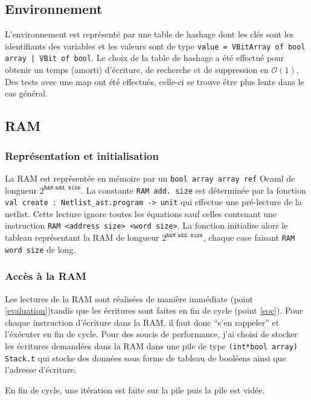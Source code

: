 \documentclass{article}
\newcommand{\code}[1]{\colorbox{White}{\texttt{#1}}}
\begin{document}
\subsection{Environnement}
\label{sec:environnement}

L'environnement est représenté par une table de hashage dont les clés
sont les identifiants des variables et les valeurs sont de type
\texttt{value = VBitArray of bool array | VBit of bool}. Le choix de la
table de hashage a été effectué pour obtenir un temps (amorti)
d'écriture, de recherche et de suppression en $\mathcal{O}(1)$. Des
tests avec une map ont été effectués, celle-ci se trouve être plus
lente dans le cas général. 


\subsection{RAM}
\label{sec:ram}

\subsubsection{Représentation et initialisation}
La RAM est représentée en mémoire par un \code{bool array array ref}
Ocaml de longueur $2^\texttt{RAM add. size}$. La constante \texttt{RAM
add. size} est déterminée par la fonction \code{val create :
Netlist\_ast.program -> unit} qui effectue une pré-lecture de la
netlist. Cette lecture ignore toutes les équations sauf celles
contenant une instruction \code{RAM <address size> <word size>}. La
fonction initialise alors le tableau représentant la RAM de longueur
$2^\texttt{RAM add. size}$, chaque case faisant \texttt{RAM word
  size} de long.

\subsubsection{Accès à la RAM}
Les lectures de la RAM sont réalisées de manière immédiate (point \ref{evaluation})tandis que
les écritures sont faites en fin de cycle (point \ref{eoc}). Pour chaque instruction
d'écriture dans la RAM, il faut donc ``s'en rappeler'' et l'éxécuter
en fin de cycle. Pour des soucis de performance, j'ai choisi de
stocker les écritures demandées dans la RAM dans une pile de type
\code{(int*bool array) Stack.t} qui stocke des données sous forme de
tableau de booléens ainsi que l'adresse d'écriture. 

En fin de cycle, une itération est faite sur la pile puis la pile est vidée.
\end{document}
